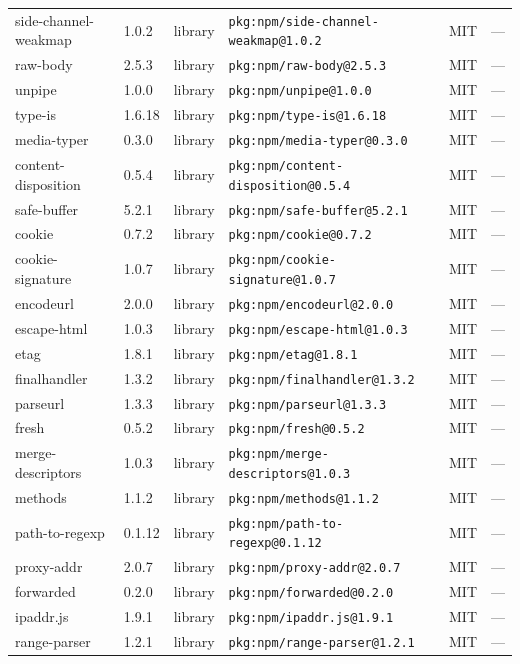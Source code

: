 \documentclass[11pt]{article}
\begin{document}
\begin{longtable}{|l|l|l|p{2.2cm}|l|p{4cm}|}
side-channel-weakmap & 1.0.2 & library & \texttt{pkg:npm/side-channel-weakmap@1.0.2} & MIT & — \\
raw-body & 2.5.3 & library & \texttt{pkg:npm/raw-body@2.5.3} & MIT & — \\
unpipe & 1.0.0 & library & \texttt{pkg:npm/unpipe@1.0.0} & MIT & — \\
type-is & 1.6.18 & library & \texttt{pkg:npm/type-is@1.6.18} & MIT & — \\
media-typer & 0.3.0 & library & \texttt{pkg:npm/media-typer@0.3.0} & MIT & — \\
content-disposition & 0.5.4 & library & \texttt{pkg:npm/content-disposition@0.5.4} & MIT & — \\
safe-buffer & 5.2.1 & library & \texttt{pkg:npm/safe-buffer@5.2.1} & MIT & — \\
cookie & 0.7.2 & library & \texttt{pkg:npm/cookie@0.7.2} & MIT & — \\
cookie-signature & 1.0.7 & library & \texttt{pkg:npm/cookie-signature@1.0.7} & MIT & — \\
encodeurl & 2.0.0 & library & \texttt{pkg:npm/encodeurl@2.0.0} & MIT & — \\
escape-html & 1.0.3 & library & \texttt{pkg:npm/escape-html@1.0.3} & MIT & — \\
etag & 1.8.1 & library & \texttt{pkg:npm/etag@1.8.1} & MIT & — \\
finalhandler & 1.3.2 & library & \texttt{pkg:npm/finalhandler@1.3.2} & MIT & — \\
parseurl & 1.3.3 & library & \texttt{pkg:npm/parseurl@1.3.3} & MIT & — \\
fresh & 0.5.2 & library & \texttt{pkg:npm/fresh@0.5.2} & MIT & — \\
merge-descriptors & 1.0.3 & library & \texttt{pkg:npm/merge-descriptors@1.0.3} & MIT & — \\
methods & 1.1.2 & library & \texttt{pkg:npm/methods@1.1.2} & MIT & — \\
path-to-regexp & 0.1.12 & library & \texttt{pkg:npm/path-to-regexp@0.1.12} & MIT & — \\
proxy-addr & 2.0.7 & library & \texttt{pkg:npm/proxy-addr@2.0.7} & MIT & — \\
forwarded & 0.2.0 & library & \texttt{pkg:npm/forwarded@0.2.0} & MIT & — \\
ipaddr.js & 1.9.1 & library & \texttt{pkg:npm/ipaddr.js@1.9.1} & MIT & — \\
range-parser & 1.2.1 & library & \texttt{pkg:npm/range-parser@1.2.1} & MIT & — \\

\end{longtable}
\end{document}
